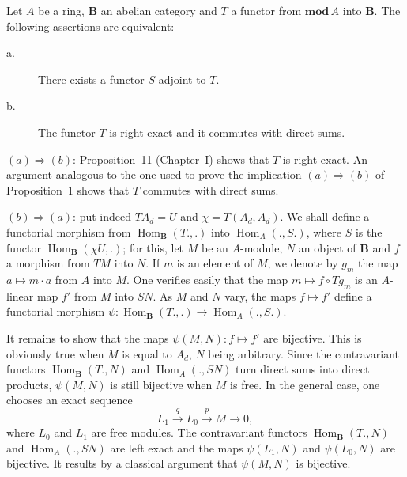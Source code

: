 \begin{propbis}
Let $A$ be a ring, $\mathbf B$ an abelian category and $T$ a functor
from $\mathbf{mod}\,A$ into $\mathbf B$.  The following assertions are
equivalent:
\begin{description}
\item[\normalfont a.] There exists a functor $S$ adjoint to $T$.
\item[\normalfont b.] The functor $T$ is right exact and it commutes
      with direct sums.
\end{description}
\end{propbis}

$(a)\Rightarrow(b)$: Proposition~11 (Chapter~I) shows that $T$ is right
exact.  An argument analogous to the one used to prove the implication
$(a)\Rightarrow(b)$ of Proposition~1 shows that $T$ commutes with
direct sums.

$(b)\Rightarrow(a)$: put indeed $TA_d=U$ and $\chi=T(A_d,A_d)$.  We
shall define a functorial morphism from
$\operatorname{Hom}_{\mathbf B}(T.,.)$ into $\operatorname{Hom}_A(.,S.)$,
where $S$ is the functor $\operatorname{Hom}_{\mathbf B}(\chi U,.)$;
for this, let $M$ be an $A$-module, $N$ an object of $\mathbf B$ and
$f$ a morphism from $TM$ into $N$.  If $m$ is an element of $M$, we
denote by $g_m$ the map $a\mapsto m\cdot a$ from $A$ into $M$.  One
verifies easily that the map $m\mapsto f\circ Tg_m$ is an $A$-linear
map $f'$ from $M$ into $SN$.  As $M$ and $N$ vary, the maps
$f\mapsto f'$ define a functorial morphism
$\psi\colon\operatorname{Hom}_{\mathbf B}(T.,.)
  \to\operatorname{Hom}_A(.,S.)$.

It remains to show that the maps $\psi(M,N)\colon f\mapsto f'$ are
bijective.  This is obviously true when $M$ is equal to $A_d$, $N$
being arbitrary.  Since the contravariant functors
$\operatorname{Hom}_{\mathbf B}(T.,N)$ and $\operatorname{Hom}_A(.,SN)$
turn direct sums into direct products, $\psi(M,N)$ is still bijective
when $M$ is free.  In the general case, one chooses an exact sequence
\[
L_1 \xrightarrow{q} L_0 \xrightarrow{p} M \to 0,
\]
where $L_0$ and $L_1$ are free modules.  The contravariant functors
$\operatorname{Hom}_{\mathbf B}(T.,N)$ and $\operatorname{Hom}_A(.,SN)$
are left exact and the maps $\psi(L_1,N)$ and $\psi(L_0,N)$ are
bijective.  It results by a classical argument that $\psi(M,N)$ is
bijective.

